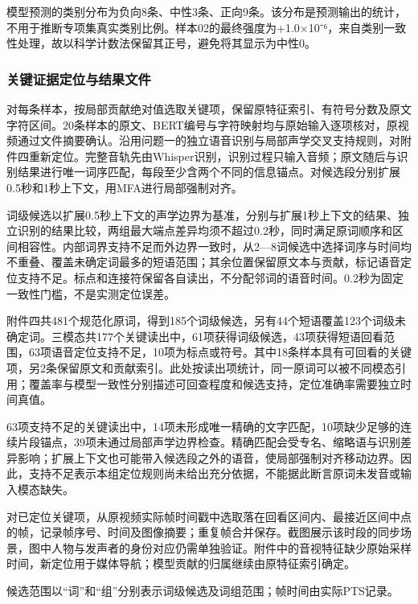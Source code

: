 模型预测的类别分布为负向8条、中性3条、正向9条。该分布是预测输出的统计，不用于推断专项集真实类别比例。样本02的最终强度为+1.0×10⁻⁶，来自类别一致性处理，故以科学计数法保留其正号，避免将其显示为中性0。

\hypertarget{q3-ux5173ux952eux8bc1ux636eux5b9aux4f4dux4e0eux7ed3ux679cux6587ux4ef6}{%
\subsubsection{关键证据定位与结果文件}\label{q3-ux5173ux952eux8bc1ux636eux5b9aux4f4dux4e0eux7ed3ux679cux6587ux4ef6}}

对每条样本，按局部贡献绝对值选取关键项，保留原特征索引、有符号分数及原文字符区间。20条样本的原文、BERT编号与字符映射均与原始输入逐项核对，原视频通过文件摘要确认。沿用问题一的独立语音识别与局部声学交叉支持规则，对附件四重新定位。完整音轨先由Whisper识别，识别过程只输入音频；原文随后与识别结果进行唯一词序匹配，每段至少含两个不同的信息锚点。对候选段分别扩展0.5秒和1秒上下文，用MFA进行局部强制对齐。

词级候选以扩展0.5秒上下文的声学边界为基准，分别与扩展1秒上下文的结果、独立识别的结果比较，两组最大端点差异均须不超过0.2秒，同时满足原词顺序和区间相容性。内部词界支持不足而外边界一致时，从2---8词候选中选择词序与时间均不重叠、覆盖未确定词最多的短语范围；其余位置保留原文本与贡献，标记语音定位支持不足。标点和连接符保留各自读出，不分配邻词的语音时间。0.2秒为固定一致性门槛，不是实测定位误差。

附件四共481个规范化原词，得到185个词级候选，另有44个短语覆盖123个词级未确定词。三模态共177个关键读出中，61项获得词级候选，43项获得短语回看范围，63项语音定位支持不足，10项为标点或符号。其中18条样本具有可回看的关键项，另2条保留原文和贡献索引。此处按读出项统计，同一原词可以被不同模态引用；覆盖率与模型一致性分别描述可回查程度和候选支持，定位准确率需要独立时间真值。

63项支持不足的关键读出中，14项未形成唯一精确的文字匹配，10项缺少足够的连续片段锚点，39项未通过局部声学边界检查。精确匹配会受专名、缩略语与识别差异影响；扩展上下文也可能带入候选段之外的语音，使局部强制对齐移动边界。因此，支持不足表示本组定位规则尚未给出充分依据，不能据此断言原词未发音或输入模态缺失。

对已定位关键项，从原视频实际帧时间戳中选取落在回看区间内、最接近区间中点的帧，记录帧序号、时间及图像摘要；重复帧合并保存。截图展示该时段的同步场景，图中人物与发声者的身份对应仍需单独验证。附件中的音视特征缺少原始采样时间，新定位用于媒体导航；模型贡献的归属继续由原特征索引确定。

候选范围以``词''和``组''分别表示词级候选及词组范围；帧时间由实际PTS记录。

